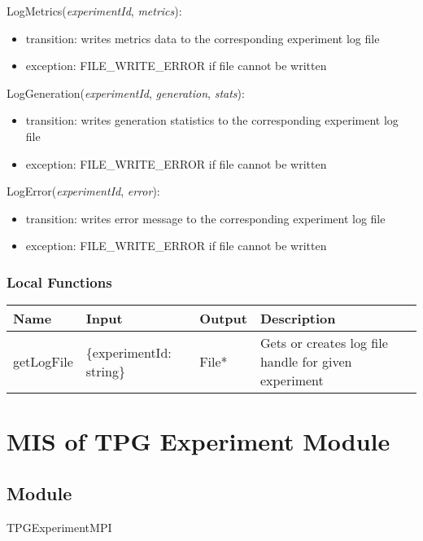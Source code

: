 \documentclass[12pt, titlepage]{article}
\begin{document}
\noindent LogMetrics(\textit{experimentId}, \textit{metrics}):
\begin{itemize}
\item transition: writes metrics data to the corresponding experiment log file
\item exception: FILE\_WRITE\_ERROR if file cannot be written
\end{itemize}

\noindent LogGeneration(\textit{experimentId}, \textit{generation}, \textit{stats}):
\begin{itemize}
\item transition: writes generation statistics to the corresponding experiment log file
\item exception: FILE\_WRITE\_ERROR if file cannot be written
\end{itemize}

\noindent LogError(\textit{experimentId}, \textit{error}):
\begin{itemize}
\item transition: writes error message to the corresponding experiment log file
\item exception: FILE\_WRITE\_ERROR if file cannot be written
\end{itemize}

\subsubsection{Local Functions}
\begin{center}
  \begin{tabular}{p{3cm} p{3cm} p{3cm} p{4cm}}
    \hline
    \textbf{Name} & \textbf{Input} & \textbf{Output} & \textbf{Description} \\
    \hline
    getLogFile & \{experimentId: string\} & File* & Gets or creates log file handle for given experiment \\
    \hline
  \end{tabular}
\end{center}

\section{MIS of TPG Experiment Module} \label{TPGExperimentModule}

\subsection{Module}
TPGExperimentMPI
\end{document}
